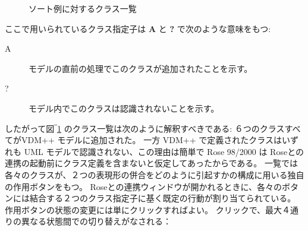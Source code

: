 \documentclass[\pformat,12pt]{jarticle}
\newcommand{\vdmpp}{VDM++}
\newcommand{\link}{Roseとの連携}
\newcommand{\rose}{Rose 98/2000}
\begin{document}
\begin{figure}[htb]
\begin{center}
\mbox{}
\caption{ソート例に対するクラス一覧　\label{fig:VDMtoUML}}
\end{center}
\end{figure}

ここで用いられているクラス指定子は {\bf A} と  {\bf ?} で次のような意味をもつ: 

\begin{description}  
\item [A]       モデルの直前の処理でこのクラスが追加されたことを示す。
\item [?]       モデル内でこのクラスは認識されないことを示す。
\end{description}  

したがって図‾\ref{fig:VDMtoUML} のクラス一覧は次のように解釈すべきである: ６つのクラスすべてが\vdmpp{} モデルに追加された。
一方 \vdmpp{} で定義されたクラスはいずれも UML モデルで認識されない、この理由は簡単で \rose{} は \link{}の起動前にクラス定義を含まないと仮定してあったからである。
一覧では各々のクラスが、２つの表現形の併合をどのように引起すかの構成に用いる独自の作用ボタンをもつ。
\link{}ウィンドウが開かれるときに、各々のボタンには結合する２つのクラス指定子に基く既定の行動が割り当てられている。
作用ボタンの状態の変更には単にクリックすればよい。
クリックで、最大４通りの異なる状態間での切り替えがなされる：
\end{document}
